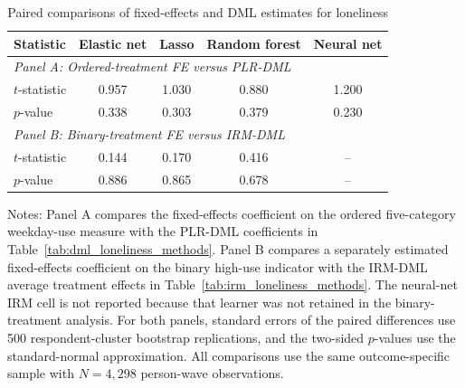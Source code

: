 \begin{table}[!htbp]
\centering
\caption{Paired comparisons of fixed-effects and DML estimates for loneliness}
\label{tab:fe_dml_comparison_loneliness}
\small
\setlength{\tabcolsep}{6pt}
\begin{tabular}{lcccc}
\hline
Statistic & Elastic net & Lasso & Random forest & Neural net
\\
\hline
\multicolumn{5}{l}{\textit{Panel A: Ordered-treatment FE versus PLR-DML}} \\
$t$-statistic & 0.957 & 1.030 & 0.880 & 1.200
\\
$p$-value & 0.338 & 0.303 & 0.379 & 0.230
\\[0.4ex]
\multicolumn{5}{l}{\textit{Panel B: Binary-treatment FE versus IRM-DML}} \\
$t$-statistic & 0.144 & 0.170 & 0.416 & --
\\
$p$-value & 0.886 & 0.865 & 0.678 & --
\\
\hline
\end{tabular}
\begin{minipage}{0.96\textwidth}
\footnotesize Notes: Panel A compares the fixed-effects coefficient on the ordered five-category weekday-use measure with the PLR-DML coefficients in Table~\ref{tab:dml_loneliness_methods}. Panel B compares a separately estimated fixed-effects coefficient on the binary high-use indicator with the IRM-DML average treatment effects in Table~\ref{tab:irm_loneliness_methods}. The neural-net IRM cell is not reported because that learner was not retained in the binary-treatment analysis. For both panels, standard errors of the paired differences use 500 respondent-cluster bootstrap replications, and the two-sided $p$-values use the standard-normal approximation. All comparisons use the same outcome-specific sample with $N=4,298$ person-wave observations.
\end{minipage}
\end{table}
